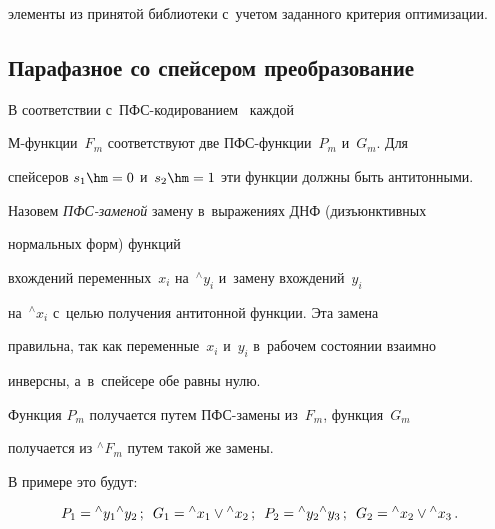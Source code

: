 элементы из принятой библиотеки с~учетом заданного критерия оптимизации.





\subsection{Парафазное со спейсером преобразование}


       


   В соответствии с~ПФС-кодированием~\cite{1-pl} каждой  


М-функ\-ции~$F_m$ соответствуют две ПФС-функ\-ции~$P_m$ и~$G_m$. Для 


спейсеров $s_1 \hm= 0$ и~$s_2 \hm= 1$ эти функции должны быть антитонными.


   


   Назовем \textit{ПФС-заменой} замену в~выражениях ДНФ (дизъюнктивных


   нормальных форм) функций 


вхождений переменных~$x_i$ на~${}^\wedge y_i$ и~замену вхождений~$y_i$ 


на~${}^\wedge x_i$ с~целью получения антитонной функции. Эта замена 


правильна, так как переменные~$x_i$ и~$y_i$ в~рабочем состоянии взаимно 


инверсны, а~в~спейсере обе равны нулю.


   


   Функция $P_m$ получается путем ПФС-за\-ме\-ны из~$F_m$, функция~$G_m$ 


получается из ${}^\wedge F_m$ путем такой же замены.


   


   В примере это будут:


   \begin{equation*}


   P_1 = {{}^\wedge y_1}  {{}^\wedge y_2}\,;\enskip


   G_1 = {{}^\wedge x_1} \vee  {{}^\wedge x_2}\,;\enskip


   P_2 = {{}^\wedge  y_2}  {{}^\wedge y_3}\,;\enskip


   G_2 = {{}^\wedge x_2} \vee  {{}^\wedge x_3}\,.


     \end{equation*}


